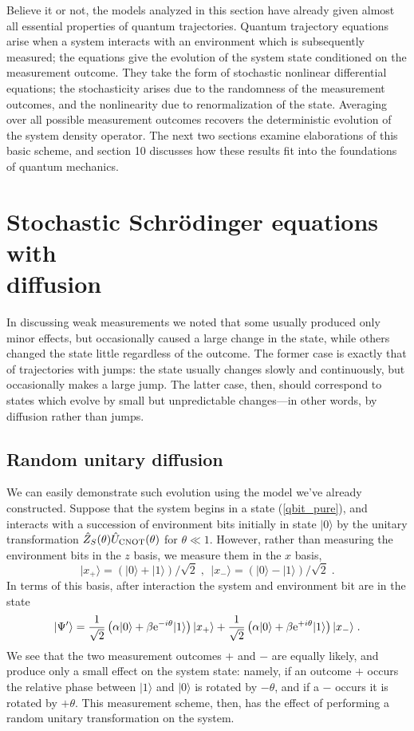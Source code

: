 \documentclass[12pt]{article}
\def\ket#1{{| #1 \rangle}}
\def\e{{\rm e}}
\def\U{{\hat U}}
\def\Z{{\hat Z}}
\begin{document}
Believe it or not, the models analyzed in this section have
already given almost all essential properties of quantum trajectories.
Quantum trajectory equations arise when a system interacts with an
environment which is subsequently measured; the equations give the
evolution of the system state conditioned on the measurement outcome.
They take the form of stochastic nonlinear differential equations; the
stochasticity arises due to the randomness of the measurement outcomes,
and the nonlinearity due to renormalization of the state.  Averaging
over all possible measurement outcomes recovers the deterministic
evolution of the system density operator.  The next two sections examine
elaborations of this basic scheme, and section 10 discusses how
these results fit into the foundations of quantum mechanics.


\section{Stochastic Schr\"odinger equations with \\ diffusion}

In discussing weak measurements we noted that some usually produced only
minor effects, but occasionally caused a large change in the state, while
others changed the state little regardless of the outcome.  The former
case is exactly that of trajectories with jumps:  the state usually
changes slowly and continuously, but occasionally makes a large jump.
The latter case, then, should correspond to states which evolve by small
but unpredictable changes---in other words, by diffusion rather than jumps.

\subsection{Random unitary diffusion}

We can easily demonstrate such evolution using the model we've already
constructed.  Suppose that the system begins in a state
(\ref{qbit_pure}), and interacts with a succession of environment bits
initially in state $\ket0$ by the unitary transformation
$\Z_S(\theta)\U_{\rm CNOT}(\theta)$ for $\theta\ll1$.
However, rather than measuring the environment bits in the $z$ basis,
we measure them in the $x$ basis,
\begin{equation}
\ket{x_+} = (\ket0 + \ket1)/\sqrt2 \;,\ \ 
\ket{x_-} = (\ket0 - \ket1)/\sqrt2 \;.
\end{equation}
In terms of this basis, after interaction the system and environment
bit are in the state
\begin{equation}
\ket{\Psi'} = {1\over\sqrt2}\left( \alpha\ket0 +
  \beta\e^{-i\theta}\ket1 \right) \ket{x_+} +
  {1\over\sqrt2}\left( \alpha\ket0 +
  \beta\e^{+i\theta}\ket1 \right) \ket{x_-} \;.
\end{equation}
We see that the two measurement outcomes $+$ and $-$ are equally likely,
and produce only a small effect on the system state:  namely, if an outcome
$+$ occurs the relative phase between $\ket1$ and $\ket0$ is rotated
by $-\theta$, and if a $-$ occurs it is rotated by $+\theta$.  This
measurement scheme, then, has the effect
of performing a random unitary transformation on the system.
\end{document}
